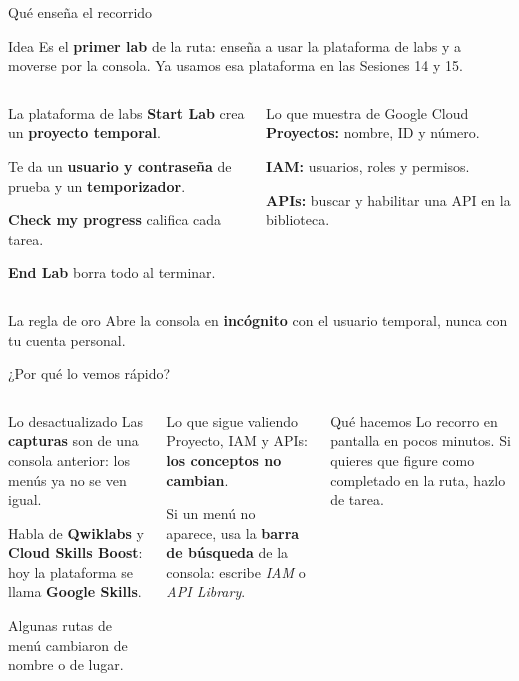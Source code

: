 \documentclass[aspectratio=169,10pt,c]{beamer}
\begin{document}
\begin{frame}{Qué enseña el recorrido}
\begin{block}{Idea}
\small Es el \textbf{primer lab} de la ruta: enseña a usar la plataforma de labs y a moverse por la consola. Ya usamos esa plataforma en las Sesiones 14 y 15.
\end{block}
\begin{columns}[T,onlytextwidth]
\begin{exampleblock}{La plataforma de labs}
\small
\textbf{Start Lab} crea un \textbf{proyecto temporal}.\par\smallskip
Te da un \textbf{usuario y contraseña} de prueba y un \textbf{temporizador}.\par\smallskip
\textbf{Check my progress} califica cada tarea.\par\smallskip
\textbf{End Lab} borra todo al terminar.
\end{exampleblock}
\begin{block}{Lo que muestra de Google Cloud}
\small
\textbf{Proyectos:} nombre, ID y número.\par\smallskip
\textbf{IAM:} usuarios, roles y permisos.\par\smallskip
\textbf{APIs:} buscar y habilitar una API en la biblioteca.
\end{block}
\end{columns}
\par\vspace{1mm}
\begin{alertblock}{La regla de oro}
\small Abre la consola en \textbf{incógnito} con el usuario temporal, nunca con tu cuenta personal.
\end{alertblock}
\end{frame}

\begin{frame}{¿Por qué lo vemos rápido?}
\begin{columns}[T,onlytextwidth]
\begin{alertblock}{Lo desactualizado}
\small
Las \textbf{capturas} son de una consola anterior: los menús ya no se ven igual.\par\smallskip
Habla de \textbf{Qwiklabs} y \textbf{Cloud Skills Boost}: hoy la plataforma se llama \textbf{Google Skills}.\par\smallskip
Algunas rutas de menú cambiaron de nombre o de lugar.
\end{alertblock}
\begin{exampleblock}{Lo que sigue valiendo}
\small
Proyecto, IAM y APIs: \textbf{los conceptos no cambian}.\par\smallskip
Si un menú no aparece, usa la \textbf{barra de búsqueda} de la consola: escribe \emph{IAM} o \emph{API Library}.
\end{exampleblock}
\begin{block}{Qué hacemos}
\small Lo recorro en pantalla en pocos minutos. Si quieres que figure como completado en la ruta, hazlo de tarea.
\end{block}
\end{columns}
\end{frame}
\end{document}
